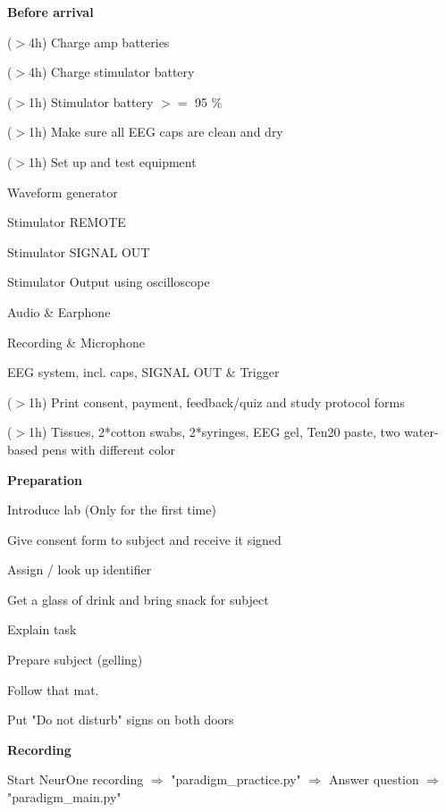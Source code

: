 \documentclass[journal, onecolumn, 11pt]{IEEEtran}
\begin{document}
\begin{itemize}
	\item \textbf{Before arrival}
	
		\item ($>$1h) Print consent, payment, feedback/quiz and study protocol forms
		\item ($>$1h) Tissues, 2*cotton swabs, 2*syringes, EEG gel, Ten20 paste, two water-based pens with different color
	\end{todolist}
	\item \textbf{Preparation}
		\begin{todolist}
			\item Introduce lab (Only for the first time)
			\item Give consent form to subject and receive it signed
			\item Assign / look up identifier
			\item Get a glass of drink and bring snack for subject
			\item Explain task
			\item Prepare subject (gelling)
			\begin{todolist}
				\item Follow that mat.
			\end{todolist}
			\item Put "Do not disturb" signs on both doors
		\end{todolist}
	\item \textbf{Recording}
		\begin{todolist}
			\item Start NeurOne recording $\Rightarrow$ "paradigm\_practice.py" $\Rightarrow$ Answer question $\Rightarrow$ "paradigm\_main.py"
						

\end{todolist}
\end{itemize}
\end{document}
